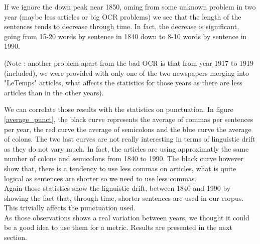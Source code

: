 If we ignore the down peak near 1850, oming from some unknown problem in two year (maybe less articles or big OCR problems) we see that the length of the sentences tends to decrease through time. In fact, the decrease is significant, going from 15-20 words by sentence in 1840 down to 8-10 words by sentence in 1990.

(Note : another problem apart from the bad OCR is that from year 1917 to 1919 (included), we were provided with only one of the two newspapers merging into "LeTemps" articles, what affects the statistics for those years as there are less articles than in the other years).

We can correlate those results with the statistics on punctuation. In figure \ref{average_punct}, the black curve represents the average of commas per sentences per year, the red curve the average of semicolons and the blue curve the average of colons. The two last curves are not really interesting in terms of linguistic drift as they do not vary much. In fact, the articles are using approximatly the same number of colons and semicolons from 1840 to 1990. The black curve however show that, there is a tendency to use less commas on articles, what is quite logical as sentences are shorter so we need to use less commas.\\

Again those statistics show the lignuistic drift, between 1840 and 1990 by showing the fact that, through time, shorter sentences are used in our corpus. This trivially affects the punctuation used. \\

As those observations shows a real variation between years, we thought it could be a good idea to use them for a metric. Results are presented in the next section.

